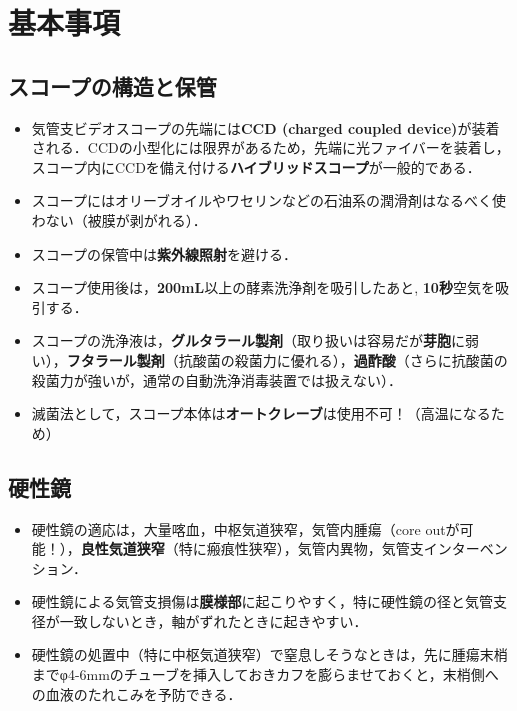 


\section{基本事項}
\subsection{スコープの構造と保管}
\begin{itemize}
\item 気管支ビデオスコープの先端には\textbf{CCD (charged coupled device)}が装着される．CCDの小型化には限界があるため，先端に光ファイバーを装着し，スコープ内にCCDを備え付ける\textbf{ハイブリッドスコープ}が一般的である．
\item スコープにはオリーブオイルやワセリンなどの石油系の潤滑剤はなるべく使わない（被膜が剥がれる）．
\item スコープの保管中は\textbf{紫外線照射}を避ける．
\item スコープ使用後は，\textbf{200mL}以上の酵素洗浄剤を吸引したあと,
\textbf{10秒}空気を吸引する．
\item スコープの洗浄液は，\textbf{グルタラール製剤}（取り扱いは容易だが\textbf{芽胞}に弱い），\textbf{フタラール製剤}（抗酸菌の殺菌力に優れる），\textbf{過酢酸}（さらに抗酸菌の殺菌力が強いが，通常の自動洗浄消毒装置では扱えない）．
\item 滅菌法として，スコープ本体は\textbf{オートクレーブ}は使用不可！（高温になるため）

\end{itemize}

\subsection{硬性鏡}
\begin{itemize}
\item 硬性鏡の適応は，大量喀血，中枢気道狭窄，気管内腫瘍（core outが可能！），\textbf{良性気道狭窄}（特に瘢痕性狭窄），気管内異物，気管支インターベンション．
\item 硬性鏡による気管支損傷は\textbf{膜様部}に起こりやすく，特に硬性鏡の径と気管支径が一致しないとき，軸がずれたときに起きやすい．
\item 硬性鏡の処置中（特に中枢気道狭窄）で窒息しそうなときは，先に腫瘍末梢までφ4-6mmのチューブを挿入しておきカフを膨らませておくと，末梢側への血液のたれこみを予防できる．

\end{itemize}

